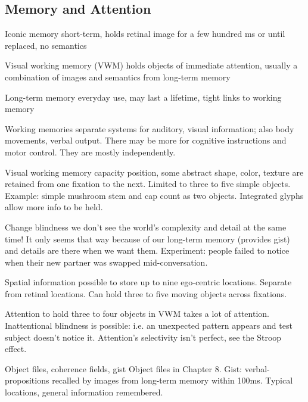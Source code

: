 \begin{mdframed}
\begin{multicols}{2}
\subsection{Memory and Attention}
\begin{compactdesc}
\item[Iconic memory] short-term, holds retinal image for a few hundred ms or
    until replaced, no semantics
\item[Visual working memory (VWM)] holds objects of immediate attention, usually a
    combination of images and semantics from long-term memory
\item[Long-term memory] everyday use, may last a lifetime, tight links to
    working memory
\item[Working memories] separate systems for auditory, visual information;
    also body movements, verbal output. There may be more for cognitive
    instructions and motor control. They are mostly independently.
\item[Visual working memory capacity] position, some abstract shape, color,
    texture are retained from one fixation to the next. Limited to three to
    five simple objects. Example: simple mushroom stem and cap count as two
    objects. Integrated glyphs allow more info to be held.
\item[Change blindness] we don't see the world's complexity and detail at
    the same time! It only seems that way because of our long-term memory
    (provides gist) and details are there when we want them. Experiment: people
    failed to notice when their new partner was swapped mid-conversation.
\item[Spatial information] possible to store up to nine ego-centric
    locations. Separate from retinal locations.
    Can hold three to five moving objects across fixations.
\item[Attention] to hold three to four objects in VWM takes a lot of attention.
    Inattentional blindness is possible: i.e. an unexpected pattern appears
    and test subject doesn't notice it. Attention's selectivity isn't perfect,
    see the Stroop effect.
\item[Object files, coherence fields, gist]
    Object files in Chapter 8. Gist: verbal-propositions recalled by images
    from long-term memory within 100ms.
    Typical locations, general information remembered.

\end{compactdesc}
\end{multicols}\end{mdframed}

